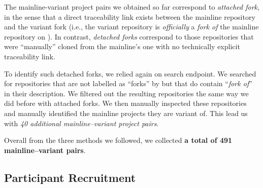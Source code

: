 The mainline-variant project pairs we obtained so far correspond to \emph{attached fork}, in the sense that a direct traceability link exists between the mainline repository and the variant fork (i.e., the variant repository is \emph{officially} a \emph{fork of} the mainline repository on \gh).
In contrast, \emph{detached forks} correspond to those repositories that were ``manually'' cloned from the mainline's one with no technically explicit traceability link.

To identify such detached forks, we relied again on \gh search endpoint. We searched for repositories that are not labelled as ``forks'' by \gh but that do contain ``\emph{fork of}'' in their description. We filtered out the resulting repositories the same way we did before with attached forks. We then manually inspected these repositories and manually identified the mainline projects they are variant of.
This lead us with \textit{40 additional mainline–variant project pairs}.

Overall from the three methods we followed, we collected \textbf{a total of 491 mainline--variant pairs}.



\subsection{Participant Recruitment}

